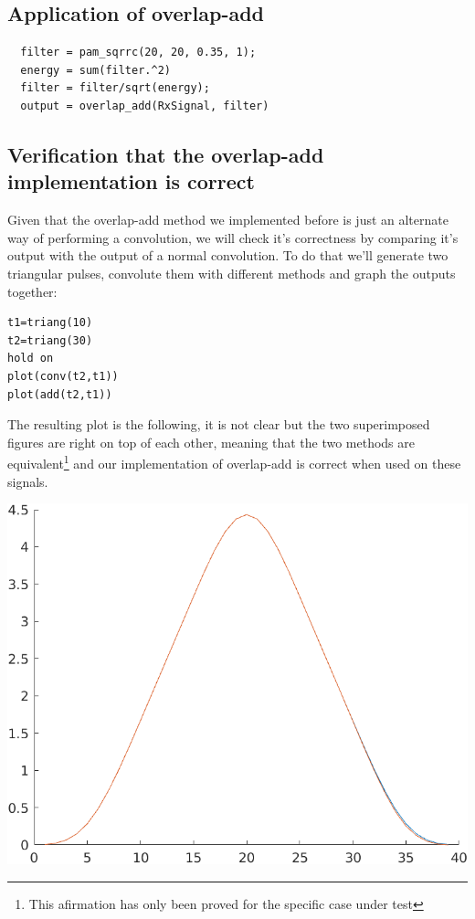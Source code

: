 \documentclass[conference,9pt]{IEEEtran}
\begin{document}
\subsection{Application of overlap-add}
\begin{verbatim}
  filter = pam_sqrrc(20, 20, 0.35, 1);
  energy = sum(filter.^2)
  filter = filter/sqrt(energy);
  output = overlap_add(RxSignal, filter)
\end{verbatim}

\subsection{Verification that the overlap-add implementation is correct}
Given that the overlap-add method we implemented before is just an alternate way of performing a convolution, we will check it's correctness by comparing it's output with the output of a normal convolution. To do that we'll generate two triangular pulses, convolute them with different methods and graph the outputs together:
\begin{verbatim}
t1=triang(10)
t2=triang(30)
hold on
plot(conv(t2,t1))
plot(add(t2,t1))
\end{verbatim}

The resulting plot is the following, it is not clear but the two superimposed figures are right on top of each other, meaning that the two methods are equivalent\footnote{This afirmation has only been proved for the specific case under test} and our implementation of overlap-add is correct when used on these signals.

\includegraphics[scale=0.6]{comp}
\end{document}
